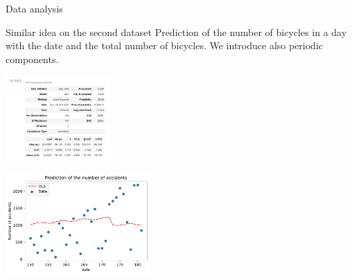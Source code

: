 \documentclass[unknownkeysallowed]{beamer}
\begin{document}
\begin{frame}{Data analysis}

\begin{block}{Similar idea on the second dataset}
Prediction of the number of bicycles in a day with the date and the total number of bicycles. We introduce also periodic components.
\end{block}


\begin{minipage}[c]{.36\linewidth}
     \begin{center}
             \includegraphics[width=4cm]{stat_model_albert}
         \end{center}
   \end{minipage} \hfill
   \begin{minipage}[c]{.55\linewidth}
    \begin{center}
            \includegraphics[width=5.5cm]{accidentpredictionalbert1}
            
        \end{center}

 \end{minipage}




\end{frame}











\end{document}
